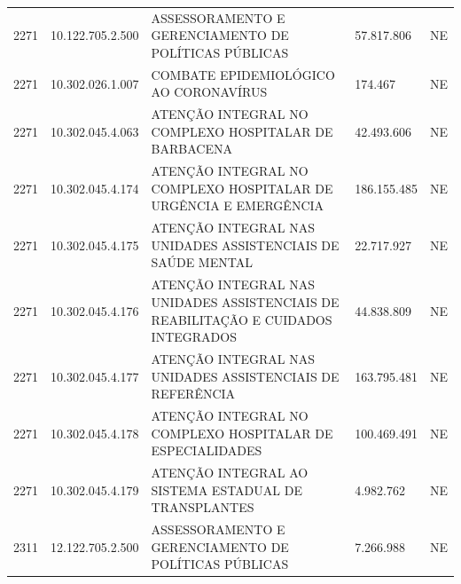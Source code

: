 \documentclass{article}
\begin{document}
\begin{longtable}[c]{m{1cm}|m{2cm}|m{10cm}|m{2cm}|m{1cm}}
\multicolumn{1}{C{1cm}|}{2271} & \multicolumn{1}{C{2cm}|}{10.122.705.2.500} & \multicolumn{1}{L{10cm}|}{ASSESSORAMENTO E GERENCIAMENTO DE POLÍTICAS PÚBLICAS} & \multicolumn{1}{R{2cm}|}{57.817.806} & \multicolumn{1}{C{1cm}}{NE} \\
\multicolumn{1}{C{1cm}|}{2271} & \multicolumn{1}{C{2cm}|}{10.302.026.1.007} & \multicolumn{1}{L{10cm}|}{COMBATE EPIDEMIOLÓGICO AO CORONAVÍRUS} & \multicolumn{1}{R{2cm}|}{174.467} & \multicolumn{1}{C{1cm}}{NE} \\
\multicolumn{1}{C{1cm}|}{2271} & \multicolumn{1}{C{2cm}|}{10.302.045.4.063} & \multicolumn{1}{L{10cm}|}{ATENÇÃO INTEGRAL NO COMPLEXO HOSPITALAR DE BARBACENA} & \multicolumn{1}{R{2cm}|}{42.493.606} & \multicolumn{1}{C{1cm}}{NE} \\
\multicolumn{1}{C{1cm}|}{2271} & \multicolumn{1}{C{2cm}|}{10.302.045.4.174} & \multicolumn{1}{L{10cm}|}{ATENÇÃO INTEGRAL NO COMPLEXO HOSPITALAR DE URGÊNCIA E EMERGÊNCIA} & \multicolumn{1}{R{2cm}|}{186.155.485} & \multicolumn{1}{C{1cm}}{NE} \\
\multicolumn{1}{C{1cm}|}{2271} & \multicolumn{1}{C{2cm}|}{10.302.045.4.175} & \multicolumn{1}{L{10cm}|}{ATENÇÃO INTEGRAL NAS UNIDADES ASSISTENCIAIS DE SAÚDE MENTAL} & \multicolumn{1}{R{2cm}|}{22.717.927} & \multicolumn{1}{C{1cm}}{NE} \\
\multicolumn{1}{C{1cm}|}{2271} & \multicolumn{1}{C{2cm}|}{10.302.045.4.176} & \multicolumn{1}{L{10cm}|}{ATENÇÃO INTEGRAL NAS UNIDADES ASSISTENCIAIS DE REABILITAÇÃO E CUIDADOS INTEGRADOS} & \multicolumn{1}{R{2cm}|}{44.838.809} & \multicolumn{1}{C{1cm}}{NE} \\
\multicolumn{1}{C{1cm}|}{2271} & \multicolumn{1}{C{2cm}|}{10.302.045.4.177} & \multicolumn{1}{L{10cm}|}{ATENÇÃO INTEGRAL NAS UNIDADES ASSISTENCIAIS DE REFERÊNCIA} & \multicolumn{1}{R{2cm}|}{163.795.481} & \multicolumn{1}{C{1cm}}{NE} \\
\multicolumn{1}{C{1cm}|}{2271} & \multicolumn{1}{C{2cm}|}{10.302.045.4.178} & \multicolumn{1}{L{10cm}|}{ATENÇÃO INTEGRAL NO COMPLEXO HOSPITALAR DE ESPECIALIDADES} & \multicolumn{1}{R{2cm}|}{100.469.491} & \multicolumn{1}{C{1cm}}{NE} \\
\multicolumn{1}{C{1cm}|}{2271} & \multicolumn{1}{C{2cm}|}{10.302.045.4.179} & \multicolumn{1}{L{10cm}|}{ATENÇÃO INTEGRAL AO SISTEMA ESTADUAL DE TRANSPLANTES} & \multicolumn{1}{R{2cm}|}{4.982.762} & \multicolumn{1}{C{1cm}}{NE} \\
\multicolumn{1}{C{1cm}|}{2311} & \multicolumn{1}{C{2cm}|}{12.122.705.2.500} & \multicolumn{1}{L{10cm}|}{ASSESSORAMENTO E GERENCIAMENTO DE POLÍTICAS PÚBLICAS} & \multicolumn{1}{R{2cm}|}{7.266.988} & \multicolumn{1}{C{1cm}}{NE} \\

\end{longtable}
\end{document}
